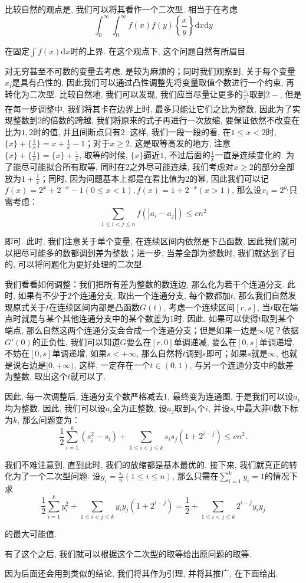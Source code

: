 \documentclass[lang=cn,12pt,thmcnt=section]{elegantbook}
\begin{document}
\begin{analysis}
比较自然的观点是, 我们可以将其看作一个二次型. 相当于在考虑
\[
\int_{0}^\infty\int_0^\infty f(x)f(y)\left\{\frac{x}{y}\right\}\mathrm{d}x\mathrm{d}y
\]

在固定$\int f(x)\mathrm{d}x$时的上界. 在这个观点下, 这个问题自然有所眉目. 

对无穷甚至不可数的变量去考虑, 是较为麻烦的；同时我们观察到, 关于每个变量$x_i$是具有凸性的, 因此我们可以通过凸性调整先将变量取值个数进行一个约束, 再转化为二次型. 比较自然地, 我们可以发现, 我们应当尽量让更多的$\frac{x_i}{x_j}$取到$2-$, 但是在每一步调整中, 我们将其卡在边界上时, 最多只能让它们之比为整数, 因此为了实现整数到$2$的倍数的跨越, 我们将原来的式子再进行一次放缩, 要保证依然不改变在比为$1,2$时的值, 并且间断点只有$2$. 这样, 我们一段一段的看, 在$1\le x<2$时, $\{x\}+\{\frac{1}{x}\}=x+\frac{1}{x}-1$；对于$x\ge 2$, 这是取等高发的地方, 注意$\{x\}+\{\frac{1}{x}\}=\{x\}+\frac{1}{x}$, 取等的时候, $\{x\}$逼近$1$, 不过后面的$\frac{1}{x}$一直是连续变化的. 为了能尽可能拟合所有取等, 同时在$2$之外尽可能连续, 我们考虑对$x\ge 2$的部分全部放为$1+\frac{1}{x}$；同时, 因为问题基本上都是在看比值为$2$的幂, 因此我们可以记$f(x)=2^x+2^{-x}-1(0\le x<1),f(x)=1+2^{-x}(x>1)$, 那么设$x_i=2^{a_i}$只需考虑：
\[
\sum_{1\le i<j\le n}f(|a_i-a_j|)\le cn^2
\]

即可. 此时, 我们注意关于单个变量, 在连续区间内依然是下凸函数, 因此我们就可以把尽可能多的数都调到差为整数；进一步, 当差全部为整数时, 我们就达到了目的, 可以将问题化为更好处理的二次型. 

我们看看如何调整：我们把所有差为整数的数连边, 那么化为若干个连通分支. 此时, 如果有不少于$2$个连通分支, 取出一个连通分支, 每个数都加$t$, 那么我们自然发现原式关于$t$在连续区间内部是凸函数$G(t)$, 考虑一个连续区间$[r,s]$, 当$t$取在端点时就是与某个其他连通分支中的某个数差为$1$时. 因此, 如果可以使得$t$取到某个端点, 那么自然这两个连通分支会合成一个连通分支；但是如果一边是$\infty$呢？依据$G'(0)$的正负性, 我们可以知道$G$要么在$[r,0]$单调递减, 要么在$[0,s]$单调递增, 不妨在$[0,s]$单调递增, 如果$s<+\infty$, 那么自然将$t$调到$s$即可；如果$s$就是$\infty$, 也就是说右边是$[0,+\infty)$, 这样, 一定存在一个$t\in(0,1)$, 与另一个连通分支中的数差为整数, 取出这个$t$就可以了. 

因此, 每一次调整后, 连通分支个数严格减去$1$, 最终变为连通图, 于是我们可以设$a_i$均为整数. 因此, 我们可以设$a_i$全为正整数, 设$a_j$取到$s_i$个$i$, 并设$s_i$中最大非$0$数下标为$k$, 那么问题变为：
\[
 \frac{1}{2}\sum_{i=1}^k (s_i^2-s_i)+\sum_{1\le i<j\le k}s_is_j(1+2^{i-j})\le cn^2.
\]

我们不难注意到, 直到此时, 我们的放缩都是基本最优的. 接下来, 我们就真正的转化为了一个二次型问题. 设$y_i=\frac{s_i}{n}(1\le i\le n)$, 那么只需在$\sum_{i=1}^ky_i=1$的情况下求
\[
\frac{1}{2}\sum_{i=1}^k y_i^2+\sum_{1\le i<j\le k}y_iy_j(1+2^{i-j})=\frac{1}{2}+\sum_{1\le i<j\le k}2^{i-j}y_iy_j
\]

的最大可能值. 

有了这个之后, 我们就可以根据这个二次型的取等给出原问题的取等. 

因为后面还会用到类似的结论, 我们将其作为引理, 并将其推广, 在下面给出.
\end{analysis}
\end{document}
